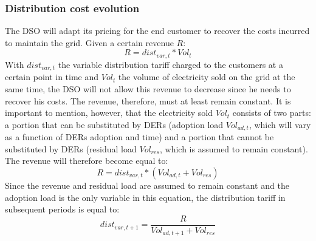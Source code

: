 \subsubsection{Distribution cost evolution}
The DSO will adapt its pricing for the end customer to recover the costs incurred to maintain the grid. Given a certain revenue $R$:
\begin{equation}
    R = dist_{var,t}*Vol_t
\end{equation}
With $dist_{var,t}$ the variable distribution tariff charged to the customers at a certain point in time and $Vol_t$ the volume of electricity sold on the grid at the same time, the DSO will not allow this revenue to decrease since he needs to recover his costs. The revenue, therefore, must at least remain constant. It is important to mention, however, that the electricity sold $Vol_t$ consists of two parts: a portion that can be substituted by DERs (adoption load $Vol_{ad,t}$, which will vary as a function of DERs adoption and time) and a portion that cannot be substituted by DERs (residual load $Vol_{res}$, which is assumed to remain constant). The revenue will therefore become equal to:
\begin{equation}
    R = dist_{var,t}*(Vol_{ad,t} + Vol_{res})
\end{equation}
Since the revenue and residual load are assumed to remain constant and the adoption load is the only variable in this equation, the distribution tariff in subsequent periods is equal to:
\begin{equation}
    dist_{var,t+1} = \frac{R}{Vol_{ad,t+1} + Vol_{res}}
\end{equation}
